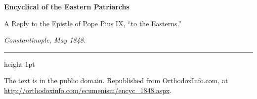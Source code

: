 \documentclass[11pt,letterpaper]{article}
\begin{document}
\color{ink}
\begin{center}
{\LARGE\bfseries\color{heading} Encyclical of the Eastern Patriarchs\par}
\vspace{1em}
{\large A Reply to the Epistle of Pope Pius IX, ``to the Easterns.''\par}
\vspace{0.6em}
{\itshape\color{subhead} Constantinople, May 1848.\par}
\vspace{0.4em}
{\color{accent}\hrule height 1pt}
\end{center}
\vspace{1em}



\vspace{2em}
{\small\noindent The text is in the public domain. Republished from OrthodoxInfo.com,
at \url{http://orthodoxinfo.com/ecumenism/encyc_1848.aspx}.\par}
\end{document}
